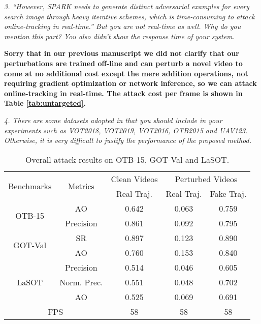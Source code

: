 \documentclass[12pt]{article}
\begin{document}
\textit{3. “However, SPARK needs to generate distinct adversarial examples for every search image through heavy iterative schemes, which is time-consuming to attack online-tracking in real-time.” But you are not real-time as well. Why do you mention this part? You also didn’t show the response time of your system.}

\textbf{Sorry that in our previous manuscript we did not clarify that our perturbations are trained off-line and can perturb a novel video to come at no additional cost except the mere addition operations, not requiring gradient optimization or network inference, so we can attack online-tracking in real-time. The attack cost per frame is shown in Table \ref{tab:untargeted}.}

\textit{4. There are some datasets adopted in \cite{SPARK,RTAA} that you should include in your experiments such as VOT2018, VOT2019, VOT2016, OTB2015 and UAV123. Otherwise, it is very difficult to justify the performance of the proposed method.}

\begin{table}[t]
    \renewcommand\thetable{V}
    \centering
    \caption{Overall attack results on OTB-15, GOT-Val and LaSOT.}
    \begin{tabular}{c c | c | c | c}
    \toprule
    \multirow{2}{*}[-2pt]{Benchmarks} & \multirow{2}{*}[-2pt]{Metrics} & Clean Videos    & \multicolumn{2}{c}{Perturbed Videos}  \\
    \cmidrule{3-5}
                              &                         & Real Traj. & Real Traj. & Fake Traj.     \\ 
    \midrule
    \multirow{2}{*}{OTB-15} 
    & AO   & 0.642 & 0.063 & 0.759\\
    & Precision & 0.861 & 0.092 & 0.795\\
    \midrule
    \multirow{2}{*}{GOT-Val} 
    & SR & 0.897 & 0.123 & 0.890\\
    & AO & 0.760 & 0.153 & 0.840 \\
    \midrule
    \multirow{3}{*}{LaSOT} 
    & Precision  & 0.514 & 0.046 & 0.605\\
    & Norm. Prec.& 0.551 & 0.048 & 0.702\\
    & AO         & 0.525 & 0.069 & 0.691\\
    \midrule
    \multicolumn{2}{c|}{FPS} & 58 & 58 & 58\\
    \bottomrule
    \end{tabular}
    \label{tab:benchmark results}
\end{table}
\end{document}
